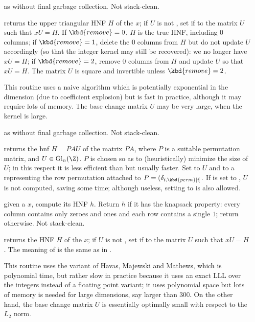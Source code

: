  as 
without final garbage collection. Not stack-clean.

 returns the upper triangular
HNF $H$ of the  $x$; if $U$ is not , set if to the matrix
$U$ such that $x U = H$. If $\kbd{remove} = 0$, $H$ is the true HNF,
including $0$ columns; if $\kbd{remove} = 1$, delete the $0$ columns from $H$
but do not update $U$ accordingly (so that the integer kernel may still be
recovered): we no longer have $x U = H$; if $\kbd{remove} = 2$, remove $0$
columns from $H$ and update $U$ so that $x U = H$. The matrix $U$ is square
and invertible unless $\kbd{remove} = 2$.

This routine uses a naive algorithm which is potentially exponential in the
dimension (due to coefficient explosion) but is fast in practice, although it
may require lots of memory. The base change matrix $U$ may be very large,
when the kernel is large.

 as  without
final garbage collection. Not stack-clean.

 returns the hnf
$H = P A U$ of the matrix $P A$, where $P$ is a suitable permutation matrix,
and $U\in \text{Gl}_n(\Z)$. $P$ is chosen so as to (heuristically) minimize the
size of $U$; in this respect it is less efficient than 
but usually faster. Set  to $U$ and  to a 
representing the row permutation attached to $P = (\delta_{i,\kbd{perm}[i]}$.
If  is set to , $U$ is not computed, saving some time;
although useless, setting  to  is also allowed.

 given a  $x$, compute its
HNF $h$. Return $h$ if it has the knapsack property: every column contains
only zeroes and ones and each row contains a single $1$;
return  otherwise. Not stack-clean.

 returns the HNF $H$ of the
 $x$; if $U$ is not , set if to the matrix $U$ such that $x
U = H$. The meaning of  is the same as in .

This routine uses the  variant of Havas, Majewski and Mathews, which is
polynomial time, but rather slow in practice because it uses an exact LLL
over the integers instead of a floating point variant; it uses polynomial
space but lots of memory is needed for large dimensions, say larger than 300.
On the other hand, the base change matrix $U$ is essentially optimally small
with respect to the $L_2$ norm.

